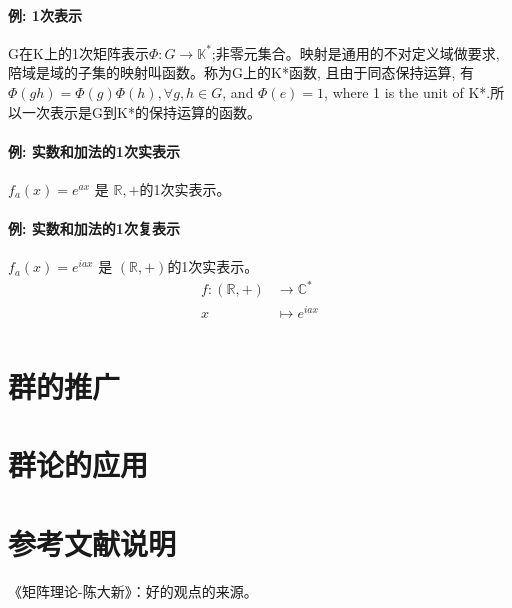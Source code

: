 \documentclass[UTF8]{../../09-Mathematics}
\begin{document}
\subsubsection{例: 1次表示}
G在K上的1次矩阵表示$\Phi: G \to \mathbb K^*$;非零元集合。映射是通用的不对定义域做要求, 陪域是域的子集的映射叫函数。称为G上的K*函数, 且由于同态保持运算, 有$\Phi (gh)=\Phi (g)\Phi(h), \forall g,h \in G$, and $\Phi(e)=1$, where 1 is the unit of K*.所以一次表示是G到K*的保持运算的函数。

\subsubsection{例: 实数和加法的1次实表示}
$f_a(x)=e^{ax}$ 是 $\mathbb R, +$的1次实表示。

\subsubsection{例: 实数和加法的1次复表示}
$f_a(x)=e^{iax}$ 是 $(\mathbb R, +)$的1次实表示。
\begin{equation}
\label{fubiaohsi}
\begin{split}
f:(\mathbb R, +) &\to \mathbb C^*\\
x  &\mapsto e^{iax}\\
\end{split}
\end{equation}
 

\chapter{群的推广}
\chapter{群论的应用}






\chapter{参考文献说明}
《矩阵理论-陈大新》：好的观点的来源。


\end{document}
